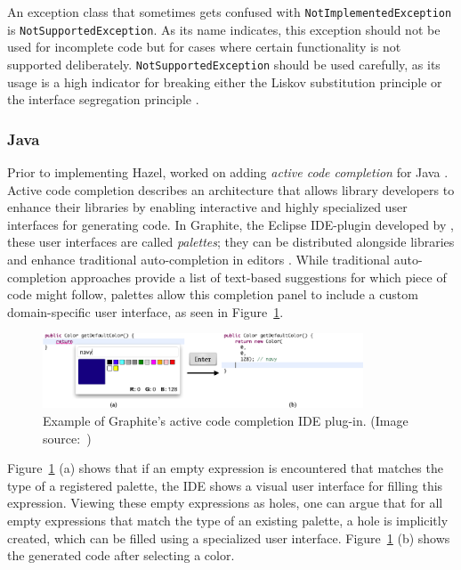 An exception class that sometimes gets confused with \texttt{NotImplementedException} is \texttt{NotSupportedException}.
As its name indicates, this exception should not be used for incomplete code but for cases where certain functionality is not supported deliberately.
\texttt{NotSupportedException} should be used carefully, as its usage is a high indicator for breaking either the Liskov substitution principle or the interface segregation principle \cite{patrik_liskov_2017}.


\subsubsection{Java}
Prior to implementing Hazel, \citeauthor{omar_active_2012} worked on adding \emph{active code completion} for Java \cite{omar_active_2012}.
Active code completion describes an architecture that allows library developers to enhance their libraries by enabling interactive and highly specialized user interfaces for generating code.
In Graphite, the Eclipse IDE-plugin developed by \citeauthor{omar_active_2012}, these user interfaces are called \emph{palettes}; they can be distributed alongside libraries and enhance traditional auto-completion in editors \cite{omar_active_2012}.
While traditional auto-completion approaches provide a list of text-based suggestions for which piece of code might follow, palettes allow this completion panel to include a custom domain-specific user interface, as seen in Figure~\ref{fig:graphite-active-code-completion}.

\begin{figure}[ht]
    \centering
    \includegraphics[width=0.85\textwidth]{images/active-code-completion}
    \caption{Example of Graphite's active code completion IDE plug-in. (Image source:~\cite{omar_active_2012})}
    \label{fig:graphite-active-code-completion}
\end{figure}

Figure~\ref{fig:graphite-active-code-completion} (a) shows that if an empty expression is encountered that matches the type of a registered palette, the IDE shows a visual user interface for filling this expression.
Viewing these empty expressions as holes, one can argue that for all empty expressions that match the type of an existing palette, a hole is implicitly created, which can be filled using a specialized user interface.
Figure~\ref{fig:graphite-active-code-completion} (b) shows the generated code after selecting a color.

